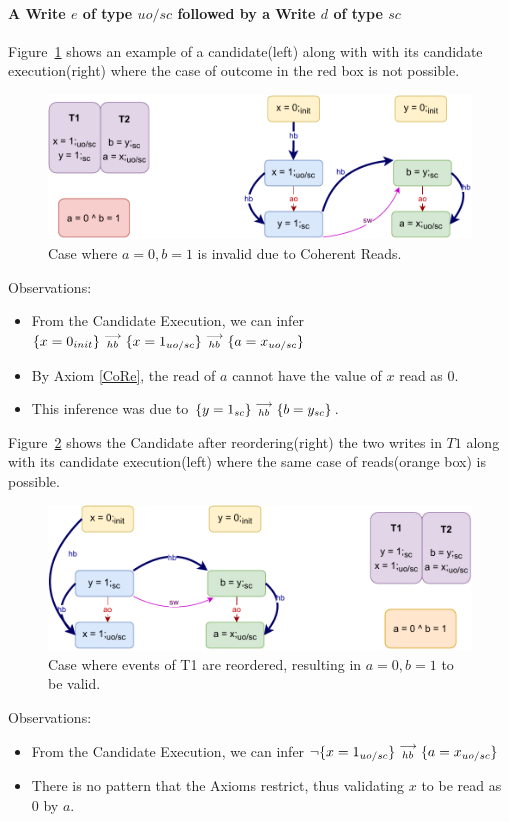     \paragraph{A Write $e$ of type $uo/sc$ followed by a Write $d$ of type $sc$}
        
        Figure~\ref{reord_counter:example4(a)} shows an example of a candidate(left) along with with its candidate execution(right) where the case of outcome in the red box is not possible. 
        \begin{figure}[H]
            \centering
            \includegraphics[scale=0.7]{7.CounterExamples/ReorderingCandidate/Example7(Wuo,sc-Wsc).pdf}
            \caption{Case where $a = 0, b = 1$ is invalid due to Coherent Reads.}
            \label{reord_counter:example4(a)}
        \end{figure}
        
        Observations:
        \begin{itemize}
            \item From the Candidate Execution, we can infer $\{x=0_{init}\}\stackrel{\longrightarrow}{_{hb}}\{x=1_{uo/sc}\}\stackrel{\longrightarrow}{_{hb}}\{a=x_{uo/sc}\}$
            \item By Axiom \ref{CoRe}, the read of $a$ cannot have the value of $x$ read as $0$. 
            \item This inference was due to $\{y=1_{sc}\}\stackrel{\longrightarrow}{_{hb}}\{b=y_{sc}\}$.
        \end{itemize}

        Figure~\ref{reord_counter:example4(b)} shows the Candidate after reordering(right) the two writes in $T1$ along with its candidate execution(left) where the same case of reads(orange box) is possible. 
        \begin{figure}[H]
            \centering
            \includegraphics[scale=0.7]{7.CounterExamples/ReorderingCandidate/Example7R(Wuo,sc-Wsc).pdf}
            \caption{Case where events of T1 are reordered, resulting in $a = 0,  b = 1$ to be valid.}
            \label{reord_counter:example4(b)}
        \end{figure}
        
        Observations:
        \begin{itemize}
            \item From the Candidate Execution, we can infer $\neg\{x=1_{uo/sc}\}\stackrel{\longrightarrow}{_{hb}}\{a=x_{uo/sc}\}$
            \item There is no pattern that the Axioms restrict, thus validating $x$ to be read as $0$ by $a$. 
        \end{itemize}